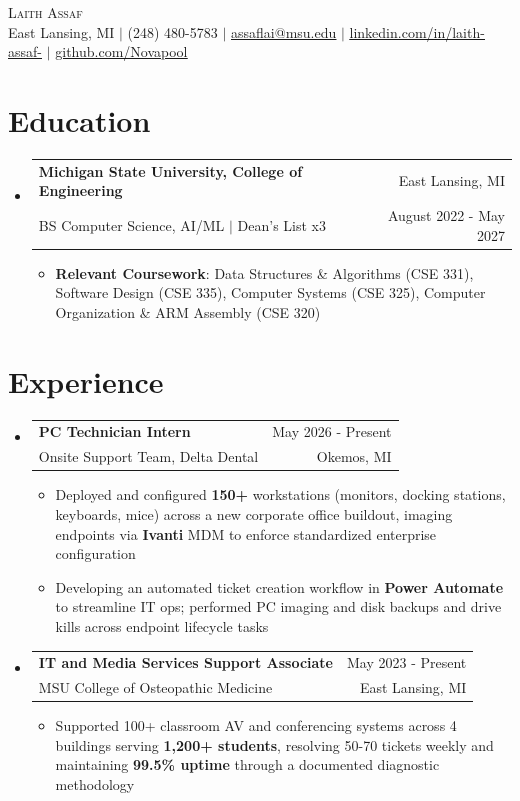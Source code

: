 \documentclass[letterpaper,11pt]{article}
\makeatletter
\newcommand{\resumeItem}[1]{
  \item\small{
    {#1 \vspace{-2pt}}
  }
}
\newcommand{\resumeSubheading}[4]{
  \vspace{-2pt}\item
    \begin{tabular*}{0.97\textwidth}[t]{l@{\extracolsep{\fill}}r}
      \textbf{#1} & \small #2 \\
      \small#3 & \small #4 \\
    \end{tabular*}\vspace{-7pt}
}
\newcommand{\resumeSubHeadingListStart}{\begin{itemize}[leftmargin=0.15in, label={}]}
\newcommand{\resumeSubHeadingListEnd}{\end{itemize}}
\newcommand{\resumeItemListStart}{\begin{itemize}}
\newcommand{\resumeItemListEnd}{\end{itemize}\vspace{-5pt}}
\makeatother
\begin{document}
\begin{center}
    {\Huge \scshape Laith Assaf} \\ \vspace{1pt}
    \small East Lansing, MI $|$ (248) 480-5783 $|$ \href{mailto:assaflai@msu.edu}{\underline{assaflai@msu.edu}} $|$ \href{https://linkedin.com/in/laith-assaf-}{\underline{linkedin.com/in/laith-assaf-}} $|$ \href{https://github.com/Novapool}{\underline{github.com/Novapool}}
\end{center}
\section{Education}
  \resumeSubHeadingListStart
    \resumeSubheading
      {Michigan State University, College of Engineering}{East Lansing, MI}
      {BS Computer Science, AI/ML $|$ Dean's List x3}{August 2022 - May 2027}
      \resumeItemListStart
        \resumeItem{\textbf{Relevant Coursework}: Data Structures \& Algorithms (CSE 331), Software Design (CSE 335), Computer Systems (CSE 325), Computer Organization \& ARM Assembly (CSE 320)}
      \resumeItemListEnd
  \resumeSubHeadingListEnd

\section{Experience}
  \resumeSubHeadingListStart
    \resumeSubheading
      {PC Technician Intern}{May 2026 - Present}
      {Onsite Support Team, Delta Dental}{Okemos, MI}
      \resumeItemListStart
        \resumeItem{Deployed and configured \textbf{150+} workstations (monitors, docking stations, keyboards, mice) across a new corporate office buildout, imaging endpoints via \textbf{Ivanti} MDM to enforce standardized enterprise configuration}
        \resumeItem{Developing an automated ticket creation workflow in \textbf{Power Automate} to streamline IT ops; performed PC imaging and disk backups and drive kills across endpoint lifecycle tasks}
      \resumeItemListEnd
    \resumeSubheading
      {IT and Media Services Support Associate}{May 2023 - Present}
      {MSU College of Osteopathic Medicine}{East Lansing, MI}
      \resumeItemListStart
        \resumeItem{Supported 100+ classroom AV and conferencing systems across 4 buildings serving \textbf{1,200+ students}, resolving 50-70 tickets weekly and maintaining \textbf{99.5\% uptime} through a documented diagnostic methodology}
      \resumeItemListEnd
  \resumeSubHeadingListEnd
\end{document}
